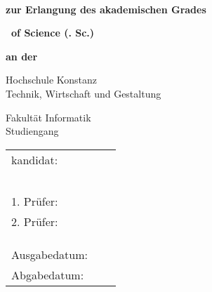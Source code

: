 \begin{titlepage}

\AddToShipoutPicture*{\BackgroundImgTitlePage}

\vspace*{\bigskipamount}


{\makeatletter
\fboxsep=0pt
\colorbox{htwg-white}{\begin{minipage}[t]{145mm}
    \begin{flushleft}
        \color{htwg-teal}\Huge{\@report@typetext}
        \\
        \color{htwg-teal}\Huge\textbf{\@title}
    \end{flushleft}
\end{minipage}}
\makeatother}

\bigskip
\bigskip

{
\setlength{\parskip}{0.5cm}
\begin{center}
	\textbf{zur Erlangung des akademischen Grades}
	
	\textbf{\Large \type\ of Science (\typeshortcut. Sc.)}
	
	\textbf{an der}
	
	\textsf{\huge Hochschule Konstanz}\\
	{\small Technik, Wirtschaft und Gestaltung}
	
    \textsf{\Large Fakultät Informatik} \\
	Studiengang \studiengang
	
\end{center}
}

\bigskip
\bigskip
\bigskip

\begin{center}
	\begingroup
	\renewcommand*{\arraystretch}{1}
	{\makeatletter
		\begin{tabular}{lll}
			\type kandidat: & \verfasser \\
							& \strasse \\
							& \wohnort \\ \\ \\ \\
	
			1. Prüfer: & \prueferA \\
			2. Prüfer: & \prueferB \\ \\ \\ \\
			
			Ausgabedatum: & \ausgabedatum \\
			Abgabedatum: & \abgabedatum
		\end{tabular}
		\makeatother}
	\endgroup
\end{center}


\end{titlepage}


